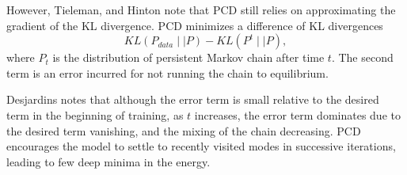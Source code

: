 However, Tieleman, and Hinton \cite{tieleman2009using} note that PCD still relies on approximating the gradient of the KL divergence. PCD minimizes a difference of KL divergences \[KL(P_{data} \mid \mid P) - KL(P^t \mid \mid P),\] 
where $P_t$ is the distribution of persistent Markov chain after time $t$. The second term is an error incurred for not running the chain to equilibrium.

Desjardins \cite{desjardins2010tempered} notes that although the error term is small relative to the desired term in the beginning of training, as $t$ increases, the error term dominates due to the desired term vanishing, and the mixing of the chain decreasing. PCD encourages the model to settle to recently visited modes in successive iterations, leading to few deep minima in the energy. 
